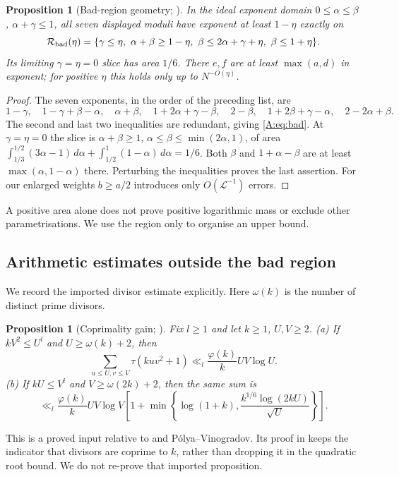 \documentclass[10pt,reqno]{amsart}
\newtheorem{proposition}[theorem]{Proposition}
\theoremstyle{definition}
\numberwithin{equation}{section}
\newcommand{\cL}{\mathcal L}
\begin{document}
\begin{proposition}[Bad-region geometry; {\cite[Proposition~3.3]{MN3}}]\label{M:3.3}
In the ideal exponent domain $0\le\alpha\le\beta$, $\alpha+\gamma\le1$,
all seven displayed moduli have exponent at least $1-\eta$ exactly on
\begin{equation}\label{A:eq:bad}
 \mathcal R_{\rm bad}(\eta)=
 \{\gamma\le\eta,\ \alpha+\beta\ge1-\eta,\
              \beta\le2\alpha+\gamma+\eta,\ \beta\le1+\eta\}.
\end{equation}
Its limiting $\gamma=\eta=0$ slice has area $1/6$. There
$e,f$ are at least $\max(a,d)$ in exponent; for positive $\eta$ this holds
only up to $N^{-O(\eta)}$.
\end{proposition}
\begin{proof}
The seven exponents, in the order of the preceding list, are
\[
 1-\gamma,\quad1-\gamma+\beta-\alpha,\quad\alpha+\beta,\quad
 1+2\alpha+\gamma-\beta,\quad2-\beta,\quad
 1+2\beta+\gamma-\alpha,\quad2-2\alpha+\beta.
\]
The second and last two inequalities are redundant, giving
\eqref{A:eq:bad}. At $\gamma=\eta=0$ the slice is
$\alpha+\beta\ge1$, $\alpha\le\beta\le\min(2\alpha,1)$, of area
$\int_{1/3}^{1/2}(3\alpha-1)\,d\alpha+
\int_{1/2}^1(1-\alpha)\,d\alpha=1/6$.
Both $\beta$ and $1+\alpha-\beta$ are at least
$\max(\alpha,1-\alpha)$ there. Perturbing the inequalities proves the last
assertion. For our enlarged weights $b\ge a/2$ introduces only
$O(\cL^{-1})$ errors.
\end{proof}
A positive area alone does not prove positive logarithmic mass or exclude
other parametrisations. We use the region only to organise an upper bound.

\subsection{Arithmetic estimates outside the bad region}
We record the imported divisor estimate explicitly. Here $\omega(k)$ is
the number of distinct prime divisors.
\begin{proposition}[Coprimality gain; {\cite[Proposition~2.3]{MN3}}]\label{M:2.3}
Fix $l\ge1$ and let $k\ge1$, $U,V\ge2$.
\textup{(a)} If $kV^2\le U^l$ and $U\ge\omega(k)+2$, then
\[
 \sum_{u\le U,v\le V}\tau(kuv^2+1)
       \ll_l\frac{\varphi(k)}kUV\log U.
\]
\textup{(b)} If $kU\le V^l$ and $V\ge\omega(2k)+2$, then the same sum is
\[
 \ll_l\frac{\varphi(k)}kUV\log V
 \left[1+\min\left\{\log(1+k),
              \frac{k^{1/6}\log(2kU)}{\sqrt U}\right\}\right].
\]
\end{proposition}
This is a proved input relative to \cite[Theorem~7.1, Corollary~7.4]{ET}
and P\'olya--Vinogradov. Its proof in \cite[\S2]{MN3} keeps the indicator
that divisors are coprime to $k$, rather than dropping it in the quadratic
root bound. We do not re-prove that imported proposition.
\end{document}
